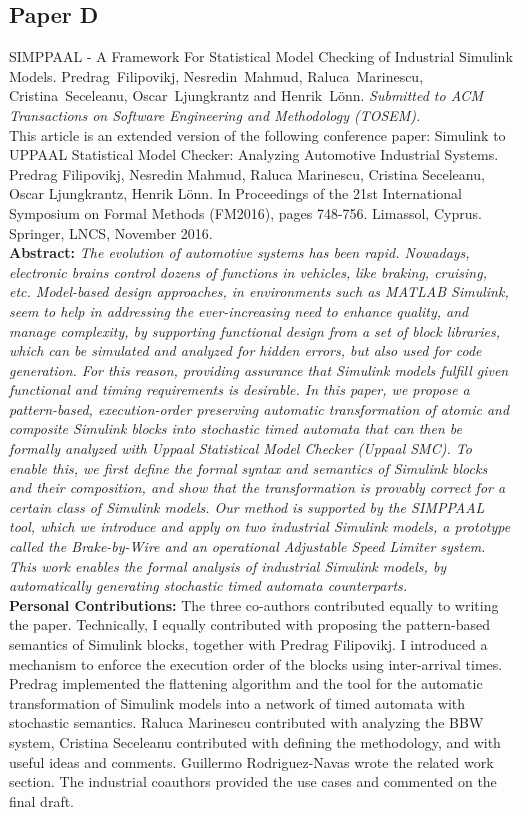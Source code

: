 \subsection*{Paper D}
SIMPPAAL - A Framework For Statistical Model Checking of Industrial Simulink Models. Predrag~Filipovikj, Nesredin~Mahmud, Raluca~Marinescu, Cristina~Seceleanu, Oscar~Ljungkrantz and Henrik~L\"{o}nn. \textit{Submitted to ACM Transactions on Software Engineering and Methodology (TOSEM).}\label{lbl_simulink_ilp}
\\[3pt]{\footnotesize This article is an extended version of the following conference paper:
     Simulink to UPPAAL Statistical Model Checker: Analyzing Automotive Industrial Systems.
Predrag Filipovikj, Nesredin Mahmud, Raluca Marinescu, Cristina Seceleanu, Oscar Ljungkrantz, Henrik L{\"o}nn. In Proceedings of the 21st International
Symposium on Formal Methods (FM2016), pages 748-756. Limassol, Cyprus. Springer, LNCS, November 2016. }\\[6pt]%
	\noindent \textbf{Abstract:} \textit{The evolution of automotive systems has been rapid. Nowadays, electronic brains control dozens of functions in vehicles, like
		braking, cruising, etc. Model-based design approaches, in environments such as MATLAB Simulink, seem to help in addressing
		the ever-increasing need to enhance quality, and manage complexity, by supporting functional design from a set of block
		libraries, which can be simulated and analyzed for hidden errors, but also used for code generation. For this reason, providing
		assurance that Simulink models fulfill given functional and timing requirements is desirable. In this paper, we propose a
		pattern-based, execution-order preserving automatic transformation of atomic and composite Simulink blocks into stochastic
		timed automata that can then be formally analyzed with Uppaal Statistical Model Checker (Uppaal SMC). To enable this, we
		first define the formal syntax and semantics of Simulink blocks and their composition, and show that the transformation is
		provably correct for a certain class of Simulink models. Our method is supported by the SIMPPAAL tool, which we introduce
		and apply on two industrial Simulink models, a prototype called the Brake-by-Wire and an operational Adjustable Speed
		Limiter system. This work enables the formal analysis of industrial Simulink models, by automatically generating stochastic
		timed automata counterparts.}\\[6pt]%
	\textbf{Personal Contributions: } The three co-authors contributed equally to writing the paper. Technically, I equally contributed with proposing the pattern-based semantics of Simulink blocks, together with Predrag Filipovikj. I introduced a mechanism to enforce the execution order of the blocks using inter-arrival times. Predrag implemented the flattening algorithm and the tool for the automatic transformation of Simulink models into a network of timed automata with stochastic semantics. Raluca Marinescu contributed with analyzing the BBW system, Cristina Seceleanu contributed with defining the methodology, and with useful ideas and comments. Guillermo Rodriguez-Navas wrote the related work section. The industrial coauthors provided the use cases and commented on the final draft.\\
